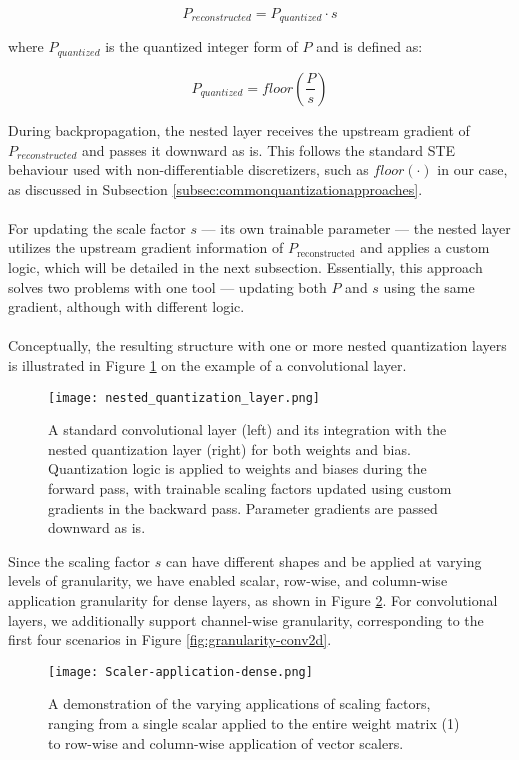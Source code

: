 \[
  P_{reconstructed} = P_{quantized} \cdot s
\]

\noindent where \( P_{quantized} \) is the quantized integer form of \( P \) and is defined as:

\[
  P_{quantized} = floor(\frac{P}{s})
\]

\noindent During backpropagation, the nested layer receives the upstream gradient of
\( P_{reconstructed} \) and passes it downward as is.  This follows the standard STE behaviour
used with non-differentiable discretizers, such as \( floor(\cdot) \) in our case,
as discussed in Subsection \ref{subsec:commonquantizationapproaches}.
\\
\\
For updating the scale factor \( s \) — its own trainable parameter — 
the nested layer utilizes the upstream gradient information of \( P_{\text{reconstructed}} \)
and applies a custom logic, which will be detailed in the next subsection. 
Essentially, this approach solves two problems with one tool — updating both 
\( P \) and \( s \) using the same gradient, although with different logic.
\\
\\
Conceptually, the resulting structure with one or more nested quantization layers is illustrated in Figure \ref{fig:nested_quantization}
on the example of a convolutional layer.
\\
\begin{figure}[h!]
  \centering
  \texttt{[image: nested\_quantization\_layer.png]}
  \caption{A standard convolutional layer (left) and its integration with the nested quantization layer (right) for both weights and bias.
  Quantization logic is applied to weights and biases during the forward pass, with trainable scaling factors 
  updated using custom gradients in the backward pass. Parameter gradients are passed downward as is.}
  \label{fig:nested_quantization}
\end{figure}

\noindent Since the scaling factor \( s \) can have different shapes and be applied at varying levels of granularity,
we have enabled scalar, row-wise, and column-wise application granularity for dense layers,
as shown in Figure \ref{fig:scaler-application-dense}. 
For convolutional layers, we additionally support channel-wise granularity,
corresponding to the first four scenarios in Figure \ref{fig:granularity-conv2d}.
\\
\begin{figure}[h!]
  \centering
  \texttt{[image: Scaler-application-dense.png]}
  \caption{A demonstration of the varying applications of scaling factors, ranging from a single scalar applied to the entire weight matrix (1) to row-wise and column-wise application of vector scalers.}
  \label{fig:scaler-application-dense}
\end{figure}

